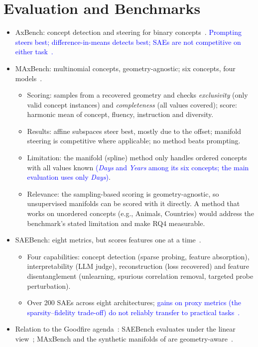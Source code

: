 \documentclass[11pt,a4paper]{article}
\newcommand{\todo}[1]{\textbf{\textcolor{red}{[TODO: #1]}}}
\newcommand{\fromextra}[1]{\textcolor{blue}{#1}}
\newcommand{\fromnotes}[1]{\textcolor{green!50!black}{#1}}
\newcommand{\fromclaude}[1]{\textcolor{orange!85!black}{#1}}
\newcommand{\todo}[1]{\ifhmode\unskip\fi} %
\newcommand{\fromextra}[1]{#1}
\newcommand{\fromnotes}[1]{#1}
\newcommand{\fromclaude}[1]{#1}
\begin{document}
\section{Evaluation and Benchmarks}
\begin{itemize}
  \item AxBench: concept detection and steering for binary concepts~\cite{wu2025axbench}. \fromextra{Prompting steers best; difference-in-means detects best; SAEs are not competitive on either task~\cite{wu2025axbench}.}
  \item MAxBench: multinomial concepts, geometry-agnostic\fromclaude{; six concepts, four models}~\cite{appapogu2026maxbench}.
  \begin{itemize}
    \item \fromclaude{Scoring:} samples from a recovered geometry and checks \emph{exclusivity} (only valid concept instances) and \emph{completeness} (all values covered); score: harmonic mean of concept, fluency, instruction and diversity.
    \item \fromclaude{Results:} affine subspaces steer best, mostly due to the offset; manifold steering is competitive where applicable; no method beats prompting.
    \item \fromclaude{Limitation:} the manifold (spline) method only handles ordered concepts \fromnotes{with all values known} \fromextra{(\emph{Days} and \emph{Years} among its six concepts; the main evaluation uses only \emph{Days})}.
    \item \fromclaude{Relevance: the sampling-based scoring is geometry-agnostic, so unsupervised manifolds can be scored with it directly. A method that works on unordered concepts (e.g., Animals, Countries) would address the benchmark's stated limitation and make RQ4 measurable.}
  \end{itemize}
  \item SAEBench: eight metrics, but scores features one at a time~\cite{karvonen2025saebench}. %
  \begin{itemize}
    \item Four capabilities: concept detection (sparse probing, feature absorption), interpretability (LLM judge), reconstruction (loss recovered) and feature disentanglement (unlearning, spurious correlation removal, targeted probe perturbation).
    \item Over 200 SAEs across eight architectures; \fromextra{gains on proxy metrics (the sparsity--fidelity trade-off) do not reliably transfer to practical tasks~\cite{karvonen2025saebench}.}
  \end{itemize}
  \item Relation to the Goodfire agenda~\cite{goodfire2026world}: SAEBench evaluates under the linear view~\cite{karvonen2025saebench}; MAxBench and the synthetic manifolds of \textcite{bhalla2026saemanifolds} are geometry-aware~\cite{appapogu2026maxbench}.
\end{itemize}
\end{document}
